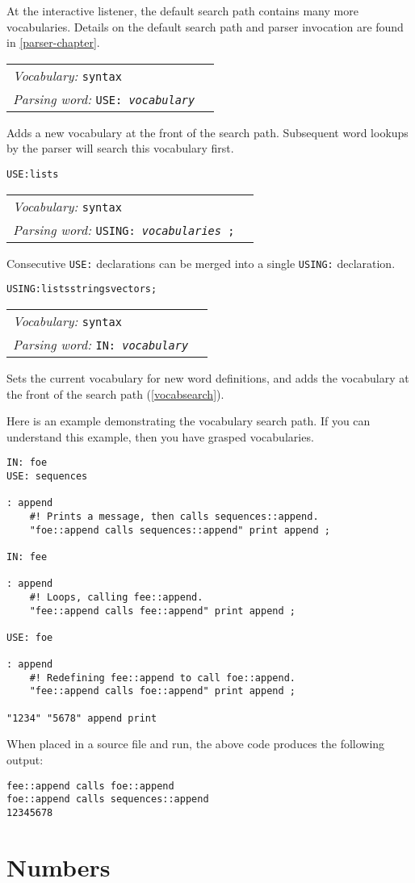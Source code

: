\documentclass{book}
\newcommand{\vocabulary}[1]{\emph{Vocabulary:} \texttt{#1}&\\}
\newcommand{\parsingword}[2]{\index{\texttt{#1}}\emph{Parsing word:} \texttt{#2}&\\}
\newcommand{\wordtable}[1]{


\begin{tabularx}{12cm}{lX}
\hline
#1
\hline
\end{tabularx}

}
\begin{document}
At the interactive listener, the default search path contains many more vocabularies. Details on the default search path and parser invocation are found in \ref{parser-chapter}.
\wordtable{
\vocabulary{syntax}
\parsingword{USE:}{USE: \emph{vocabulary}}
}
\newcommand{\useglos}{}
\useglos

Adds a new vocabulary at the front of the search path. Subsequent word lookups by the parser will search this vocabulary first.
\begin{alltt}
USE: lists
\end{alltt}
\wordtable{
\vocabulary{syntax}
\parsingword{USING:}{USING: \emph{vocabularies} ;}
}
Consecutive \texttt{USE:} declarations can be merged into a single \texttt{USING:} declaration.
\begin{alltt}
USING: lists strings vectors ;
\end{alltt}

\wordtable{
\vocabulary{syntax}
\parsingword{IN:}{IN:~\emph{vocabulary}}
}
Sets the current vocabulary for new word definitions, and adds the vocabulary at the front of the search path (\ref{vocabsearch}).

Here is an example demonstrating the vocabulary search path. If you can understand this example, then you have grasped vocabularies.
\begin{verbatim}
IN: foe
USE: sequences

: append
    #! Prints a message, then calls sequences::append.
    "foe::append calls sequences::append" print append ;

IN: fee

: append
    #! Loops, calling fee::append.
    "fee::append calls fee::append" print append ;
    
USE: foe

: append
    #! Redefining fee::append to call foe::append.
    "fee::append calls foe::append" print append ;

"1234" "5678" append print
\end{verbatim}
When placed in a source file and run, the above code produces the following output:
\begin{verbatim}
fee::append calls foe::append
foe::append calls sequences::append
12345678
\end{verbatim}

\section{Numbers}
\end{document}
